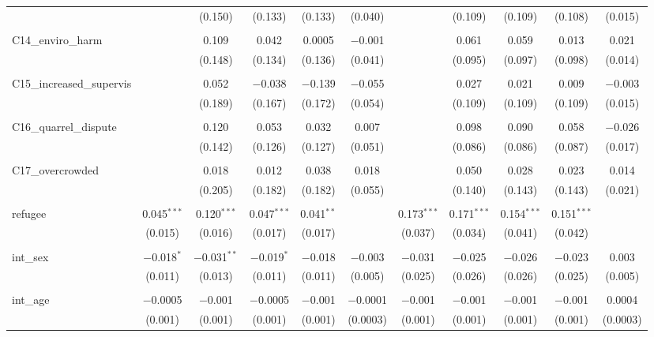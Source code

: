 \begin{table}[H]
\begin{tabular}{@{\extracolsep{4pt}}lcccccccccc}
  &  & (0.150) & (0.133) & (0.133) & (0.040) &  & (0.109) & (0.109) & (0.108) & (0.015) \\ 
  & & & & & & & & & & \\ 
 C14\_enviro\_harm &  & 0.109 & 0.042 & 0.0005 & $-$0.001 &  & 0.061 & 0.059 & 0.013 & 0.021 \\ 
  &  & (0.148) & (0.134) & (0.136) & (0.041) &  & (0.095) & (0.097) & (0.098) & (0.014) \\ 
  & & & & & & & & & & \\ 
 C15\_increased\_supervis &  & 0.052 & $-$0.038 & $-$0.139 & $-$0.055 &  & 0.027 & 0.021 & 0.009 & $-$0.003 \\ 
  &  & (0.189) & (0.167) & (0.172) & (0.054) &  & (0.109) & (0.109) & (0.109) & (0.015) \\ 
  & & & & & & & & & & \\ 
 C16\_quarrel\_dispute &  & 0.120 & 0.053 & 0.032 & 0.007 &  & 0.098 & 0.090 & 0.058 & $-$0.026 \\ 
  &  & (0.142) & (0.126) & (0.127) & (0.051) &  & (0.086) & (0.086) & (0.087) & (0.017) \\ 
  & & & & & & & & & & \\ 
 C17\_overcrowded &  & 0.018 & 0.012 & 0.038 & 0.018 &  & 0.050 & 0.028 & 0.023 & 0.014 \\ 
  &  & (0.205) & (0.182) & (0.182) & (0.055) &  & (0.140) & (0.143) & (0.143) & (0.021) \\ 
  & & & & & & & & & & \\ 
 refugee & 0.045$^{***}$ & 0.120$^{***}$ & 0.047$^{***}$ & 0.041$^{**}$ &  & 0.173$^{***}$ & 0.171$^{***}$ & 0.154$^{***}$ & 0.151$^{***}$ &  \\ 
  & (0.015) & (0.016) & (0.017) & (0.017) &  & (0.037) & (0.034) & (0.041) & (0.042) &  \\ 
  & & & & & & & & & & \\ 
 int\_sex & $-$0.018$^{*}$ & $-$0.031$^{**}$ & $-$0.019$^{*}$ & $-$0.018 & $-$0.003 & $-$0.031 & $-$0.025 & $-$0.026 & $-$0.023 & 0.003 \\ 
  & (0.011) & (0.013) & (0.011) & (0.011) & (0.005) & (0.025) & (0.026) & (0.026) & (0.025) & (0.005) \\ 
  & & & & & & & & & & \\ 
 int\_age & $-$0.0005 & $-$0.001 & $-$0.0005 & $-$0.001 & $-$0.0001 & $-$0.001 & $-$0.001 & $-$0.001 & $-$0.001 & 0.0004 \\ 
  & (0.001) & (0.001) & (0.001) & (0.001) & (0.0003) & (0.001) & (0.001) & (0.001) & (0.001) & (0.0003) \\ 

\end{tabular}
\end{table}
